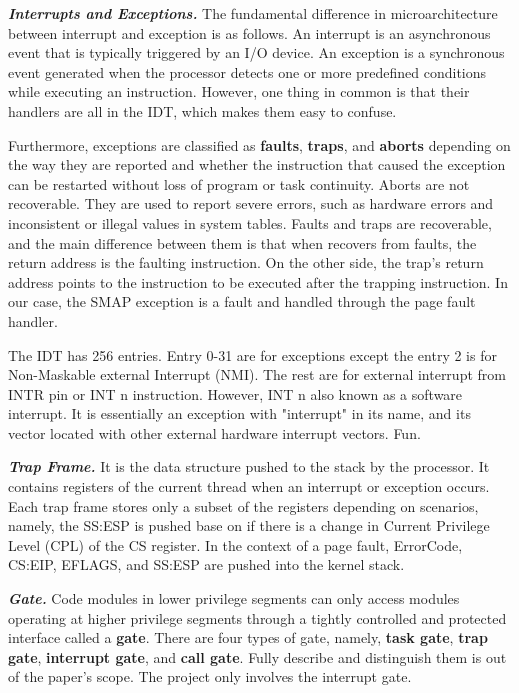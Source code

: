 \textbf{\textit{Interrupts and Exceptions.}} The fundamental difference in microarchitecture between interrupt and exception is as follows.  An interrupt is an asynchronous event that is typically triggered by an I/O device. An exception is a synchronous event generated when the processor detects one or more predefined conditions while executing an instruction. However, one thing in common is that their handlers are all in the IDT, which makes them easy to confuse.

Furthermore, exceptions are classified as \textbf{faults}, \textbf{traps}, and \textbf{aborts} depending on the way they are reported and whether the instruction that caused the exception can be restarted without loss of program or task continuity. Aborts are not recoverable. They are used to report severe errors, such as hardware errors and inconsistent or illegal values in system tables. Faults and traps are recoverable, and the main difference between them is that when recovers from faults, the return address is the faulting instruction. On the other side, the trap's return address points to the instruction to be executed after the trapping instruction. In our case, the SMAP exception is a fault and handled through the page fault handler.

The IDT has 256 entries. Entry 0-31 are for exceptions except the entry 2 is for Non-Maskable external Interrupt (NMI). The rest are for external interrupt from INTR pin or INT n instruction. However, INT n also known as a software interrupt. It is essentially an exception with "interrupt" in its name, and its vector located with other external hardware interrupt vectors. Fun.



\textbf{\textit{Trap Frame.}} It is the data structure pushed to the stack by the processor. It contains registers of the current thread when an interrupt or exception occurs. Each trap frame stores only a subset of the registers depending on scenarios, namely, the SS:ESP is pushed base on if there is a change in Current Privilege Level (CPL) of the CS register.  In the context of a page fault, ErrorCode, CS:EIP, EFLAGS, and SS:ESP are pushed into the kernel stack.



\textbf{\textit{Gate.}} Code modules in lower privilege segments can only access modules operating at higher privilege segments through a tightly controlled and protected interface called a \textbf{gate}.  There are four types of gate, namely, \textbf{task gate}, \textbf{trap gate}, \textbf{interrupt gate}, and \textbf{call gate}. Fully describe and distinguish them is out of the paper's scope. The project only involves the interrupt gate.

